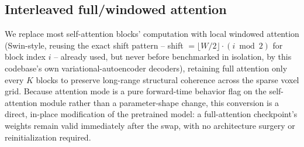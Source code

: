 \documentclass[11pt]{article}
\begin{document}
\subsection{Interleaved full/windowed attention}
We replace most self-attention blocks' computation with local windowed attention (Swin-style,
reusing the exact shift pattern -- shift $= \lfloor W/2 \rfloor \cdot (i \bmod 2)$ for block index
$i$ -- already used, but never before benchmarked in isolation, by this codebase's own
variational-autoencoder decoders), retaining full attention only every $K$ blocks to preserve
long-range structural coherence across the sparse voxel grid. Because attention mode is a pure
forward-time behavior flag on the self-attention module rather than a parameter-shape change,
this conversion is a direct, in-place modification of the pretrained model: a full-attention
checkpoint's weights remain valid immediately after the swap, with no architecture surgery or
reinitialization required.
\end{document}
